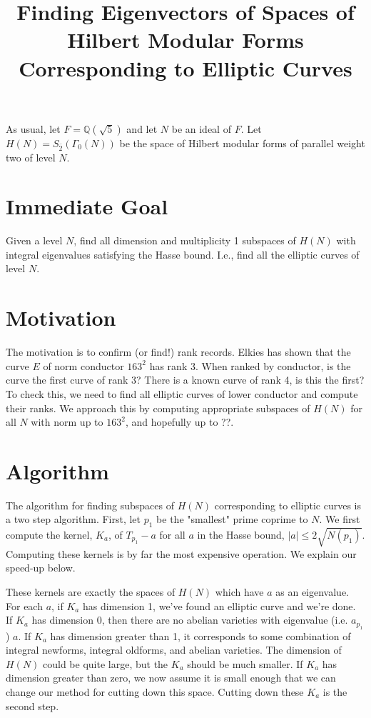 \documentclass{article}
\title{Finding Eigenvectors of Spaces of Hilbert Modular Forms Corresponding to Elliptic Curves}
\newcommand{\QF}{\mathbb{Q}(\sqrt{5})}
\begin{document}
\maketitle

As usual, 
let $F = \QF$ and let $N$ be an ideal of $F$.  
Let $H(N) = S_{\bar{2}}(\Gamma_0(N))$ be the space of Hilbert modular forms of parallel weight two of level $N$.

\section{Immediate Goal} Given a level $N$, 
find all dimension and multiplicity 1 subspaces of $H(N)$ with integral eigenvalues satisfying the Hasse bound.  
I.e., find all the elliptic curves of level $N$.

\section{Motivation}
The motivation is to confirm (or find!) rank records.  
Elkies has shown that the curve $E$ of norm conductor $163^2$ has rank 3.  
When ranked by conductor, is the curve the first curve of rank 3?  
There is a known curve of rank 4, is this the first?  
To check this, 
we need to find all elliptic curves of lower conductor and compute their ranks.  
We approach this by computing appropriate subspaces of $H(N)$ for all $N$ with norm up to $163^2$, 
and hopefully up to ??.

\section{Algorithm}

The algorithm for finding  subspaces of $H(N)$ corresponding to elliptic curves is a two step algorithm.  
First, let $p_1$ be the "smallest" prime coprime to $N$.
We first compute the kernel, $K_a$, of $T_{p_1} - a$ for all $a$ in the Hasse bound, $|a| \leq 2\sqrt{N(p_1)}$.  
Computing these kernels is by far the most expensive operation.  
We explain our speed-up below.

These kernels are exactly the spaces of $H(N)$ which have $a$ as an eigenvalue.
For each $a$, 
if $K_a$ has dimension 1, 
we've found an elliptic curve and we're done.  
If $K_a$ has dimension 0, 
then there are no abelian varieties with eigenvalue (i.e. $a_{p_1}$) $a$.  
If $K_a$ has dimension greater than 1, 
it corresponds to some combination of integral newforms, integral oldforms, and abelian varieties.  
The dimension of $H(N)$ could be quite large, 
but the $K_a$ should be much smaller.  
If $K_a$ has dimension greater than zero, 
we now assume it is small enough that we can change our method for cutting down this space.
Cutting down  these $K_a$ is the second step.
\end{document}
